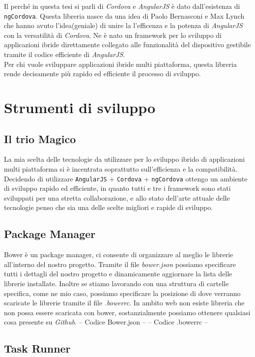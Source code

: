 Il perché in questa tesi si parli di \emph{Cordova} e \emph{AngularJS} è dato dall'esistenza di \texttt{ngCordova}. Questa libreria nasce da una idea di Paolo Bernasconi e Max Lynch che hanno avuto l'idea(geniale) di unire la l'efficenza e la potenza di \emph{AngularJS} con la versatilità di \emph{Cordova}. Ne è nato un framework per lo sviluppo di applicazioni ibride direttamente collegato alle funzionalità del dispositivo gestibile tramite il codice efficiente di \emph{AngularJS}.\\
Per chi vuole sviluppare applicazioni ibride multi piattaforma, questa libreria rende decisamente più rapido ed efficiente il processo di sviluppo.

\section{Strumenti di sviluppo}

\subsection{Il trio Magico}
La mia scelta delle tecnologie da utilizzare per lo sviluppo ibrido di applicazioni multi piattaforma si è incentrata soprattutto sull'efficienza e la compatibilità. Decidendo di utilizzare \texttt{AngularJS} + \texttt{Cordova} + \texttt{ngCordova} ottengo un ambiente di sviluppo rapido ed efficiente, in quanto tutti e tre i framework sono stati sviluppati per una stretta collaborazione, e allo stato dell'arte attuale delle tecnologie penso che sia una delle scelte migliori e rapide di sviluppo.

\subsection{Package Manager}
Bower è un package manager, ci consente di organizzare al meglio le librerie all'interno del nostro progetto. Tramite il file \emph{bower.json} possiamo specificare tutti i dettagli del nostro progetto e dinamicamente aggiornare la lista delle librerie installate. Inoltre se stiamo lavorando con una struttura di cartelle specifica, come ne mio caso, possiamo specificare la posizione di dove verranno scaricate le librerie tramite il file \emph{.bowerrc}. In ambito web non esiste libreria che non possa essere scaricata con bower, sostanzialmente possiamo ottenere qualsiasi cosa presente su \emph{Github}.
-- Codice Bower.json --
-- Codice .bowerrc --

\subsection{Task Runner}

